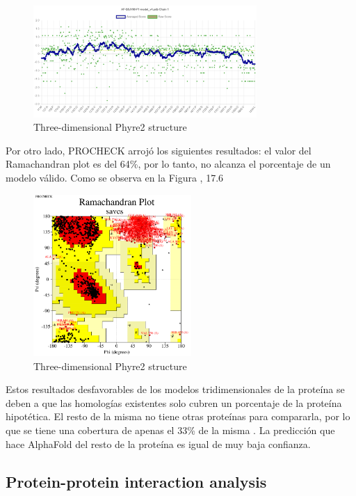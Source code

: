 \documentclass[journal,transmag]{IEEEtran}
\begin{document}
\begin{figure}[!h]
	\center
	\includegraphics[width=8.5cm]{imagenes/procheck.png}
	\caption{Three-dimensional Phyre2 structure}
	\label{16}
\end{figure}

Por otro lado, PROCHECK arrojó los siguientes resultados: el valor del Ramachandran plot es del 64\%, por lo tanto, no alcanza   el porcentaje de un modelo válido. Como se observa en la Figura , 17.6%


\begin{figure}[!h]
	\center
	\includegraphics[width=6cm]{imagenes/ramachandran.png}
	\caption{Three-dimensional Phyre2 structure}
	\label{17}
\end{figure}

Estos resultados desfavorables de los modelos tridimensionales de la proteína se deben a que las homologías existentes solo cubren un porcentaje de la proteína hipotética. El resto de la misma no  tiene otras proteínas para compararla, por lo que se tiene una cobertura de apenas el 33\% de la misma . La predicción que hace AlphaFold del resto de la proteína es igual de muy baja confianza.  


\subsection{\textbf{ Protein-protein interaction analysis}}
\end{document}

